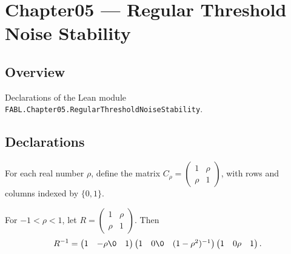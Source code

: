 \chapter{Chapter05 — Regular Threshold Noise Stability}
\section{Overview}

Declarations of the Lean module \texttt{FABL.Chapter05.RegularThresholdNoiseStability}.

\section{Declarations}

\begin{definition}
\label{FABL.correlationMatrix}
\leanok
For each real number $\rho$, define the matrix $C_\rho=\begin{pmatrix}1&\rho\\
\rho&1\end{pmatrix}$, with rows and columns indexed by $\{0,1\}$.
\end{definition}

\begin{theorem}
\label{FABL.exercise5_33a}
\leanok
{}
For $-1<\rho<1$, let $R=\begin{pmatrix}1&\rho\\\rho&1\end{pmatrix}$. Then
\[
R^{-1}=\begin{pmatrix}1&-\rho\0&1\end{pmatrix}\begin{pmatrix}1&0\0&(1-\rho^2)^{-1}\end{pmatrix}\begin{pmatrix}1&0\-\rho&1\end{pmatrix}.
\]
\end{theorem}

